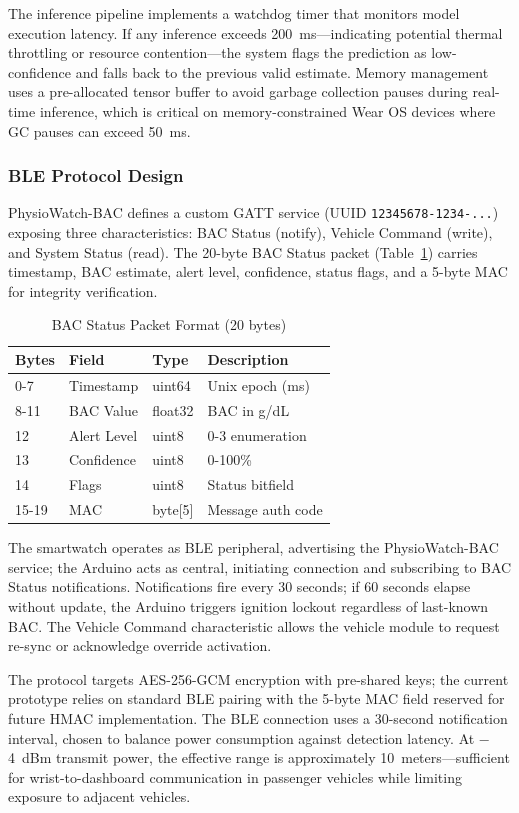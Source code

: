 \documentclass[HARVARD,Times2COL]{WileyNJDv5} %
\providecommand{\DIFadd}[1]{{\protect\color{red} #1}} %
\providecommand{\DIFaddbegin}{} %
\providecommand{\DIFaddend}{} %
\providecommand{\DIFdelbegin}{} %
\providecommand{\DIFdelend}{} %
\providecommand{\DIFscaledelfig}{0.5}
\newlength{\DIFdelgraphicswidth} %
\newlength{\DIFdelgraphicsheight} %
\providecommand{\DIFaddincludegraphics}[2][]{{\color{blue}\fbox{\DIFOincludegraphics[#1]{#2}}}} %
\providecommand{\DIFdelincludegraphics}[2][]{%
\sbox{\DIFdelgraphicsbox}{\DIFOincludegraphics[#1]{#2}}%
\settoboxwidth{\DIFdelgraphicswidth}{\DIFdelgraphicsbox} %
\settoboxtotalheight{\DIFdelgraphicsheight}{\DIFdelgraphicsbox} %
\scalebox{\DIFscaledelfig}{%
\parbox[b]{\DIFdelgraphicswidth}{\usebox{\DIFdelgraphicsbox}\\[-\baselineskip] \rule{\DIFdelgraphicswidth}{0em}}\llap{\resizebox{\DIFdelgraphicswidth}{\DIFdelgraphicsheight}{%
\setlength{\unitlength}{\DIFdelgraphicswidth}%
\begin{picture}(1,1)%
\thicklines\linethickness{2pt} %
{\color[rgb]{1,0,0}\put(0,0){\framebox(1,1){}}}%
{\color[rgb]{1,0,0}\put(0,0){\line( 1,1){1}}}%
{\color[rgb]{1,0,0}\put(0,1){\line(1,-1){1}}}%
\end{picture}%
}\hspace*{3pt}}} %
} %
\DeclareRobustCommand{\DIFaddbegin}{\DIFOaddbegin \let\includegraphics\DIFaddincludegraphics} %
\DeclareRobustCommand{\DIFaddend}{\DIFOaddend \let\includegraphics\DIFOincludegraphics} %
\DeclareRobustCommand{\DIFdelbegin}{\DIFOdelbegin \let\includegraphics\DIFdelincludegraphics} %
\DeclareRobustCommand{\DIFdelend}{\DIFOaddend \let\includegraphics\DIFOincludegraphics} %
\begin{document}
\DIFadd{The inference pipeline implements a watchdog timer that monitors model execution latency. If any inference exceeds 200~ms---indicating potential thermal throttling or resource contention---the system flags the prediction as low-confidence and falls back to the previous valid estimate. Memory management uses a pre-allocated tensor buffer to avoid garbage collection pauses during real-time inference, which is critical on memory-constrained Wear OS devices where GC pauses can exceed 50~ms.
}\DIFaddend \subsubsection{BLE Protocol Design}
PhysioWatch-BAC defines a custom GATT service (UUID \texttt{12345678-1234-...}) exposing three characteristics: BAC Status (notify), Vehicle Command (write), and System Status (read). The 20-byte BAC Status packet (Table~\ref{tab:bac_packet}) carries timestamp, BAC estimate, alert level, confidence, status flags, and a 5-byte MAC for integrity verification.

\begin{table}[htbp]
\caption{BAC Status Packet Format (20 bytes)}
\label{tab:bac_packet}
\centering
\small
\begin{tabular}{@{}llll@{}}
\toprule
\textbf{Bytes} & \textbf{Field} & \textbf{Type} & \textbf{Description} \\
\midrule
0-7 & Timestamp & uint64 & Unix epoch (ms) \\
8-11 & BAC Value & float32 & BAC in g/dL \\
12 & Alert Level & uint8 & 0-3 enumeration \\
13 & Confidence & uint8 & 0-100\% \\
14 & Flags & uint8 & Status bitfield \\
15-19 & MAC & byte[5] & Message auth code \\
\bottomrule
\end{tabular}
\end{table}

\par
The smartwatch operates as BLE peripheral, advertising the PhysioWatch-BAC service; the Arduino acts as central, initiating connection and subscribing to BAC Status notifications. Notifications fire every 30 seconds; if 60 seconds elapse without update, the Arduino triggers ignition lockout regardless of last-known BAC. The Vehicle Command characteristic allows the vehicle module to request re-sync or acknowledge override activation. \par
The protocol targets AES-256-GCM encryption with pre-shared keys; the current prototype relies on standard BLE pairing with the 5-byte MAC field reserved for future HMAC implementation. \DIFdelbegin %
\DIFdelend \DIFaddbegin \DIFadd{The BLE connection uses a 30-second notification interval, chosen to balance power consumption against detection latency. At $-$4~dBm transmit power, the effective range is approximately 10~meters---sufficient for wrist-to-dashboard communication in passenger vehicles while limiting exposure to adjacent vehicles.
}
\end{document}
